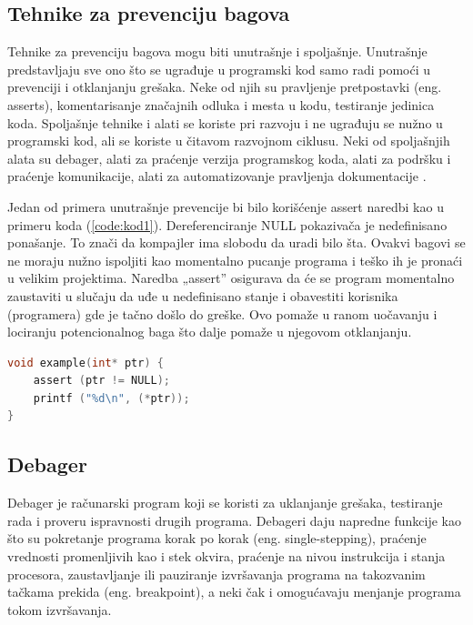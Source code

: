 \documentclass[a4paper]{article}
\begin{document}
\subsection{Tehnike za prevenciju bagova}
\label{subsec:Tehnike za prevenciju bagova}

Tehnike za prevenciju bagova mogu biti unutrašnje i spoljašnje. Unutrašnje predstavljaju sve ono što se ugrađuje u programski kod samo radi pomoći u prevenciji i otklanjanju grešaka. Neke od njih su pravljenje pretpostavki (eng. asserts), komentarisanje značajnih odluka i mesta u kodu, testiranje jedinica koda. Spoljašnje tehnike i alati se koriste pri razvoju i ne ugrađuju se nužno u programski kod, ali se koriste u čitavom razvojnom ciklusu. Neki od spoljašnjih alata su debager, alati za praćenje verzija programskog koda, alati za podršku i praćenje komunikacije, alati za automatizovanje pravljenja dokumentacije \cite{bagovi_smalkov}.  

Jedan od primera unutrašnje prevencije bi bilo korišćenje assert naredbi kao u primeru koda (\ref{code:kod1}). Dereferenciranje NULL pokazivača je nedefinisano ponašanje. To znači da kompajler ima slobodu da uradi bilo šta. Ovakvi bagovi se ne moraju nužno ispoljiti kao momentalno pucanje programa i teško ih je pronaći u velikim projektima. Naredba „assert” osigurava da će se program momentalno zaustaviti u slučaju da uđe u nedefinisano stanje i obavestiti korisnika (programera) gde je tačno došlo do greške. Ovo pomaže u ranom uočavanju i lociranju potencionalnog baga što dalje pomaže u njegovom otklanjanju.\\

\begin{center}
\begin{lstlisting}[language=C,caption=Primer upotrebe assert naredbe, label=code:kod1]
void example(int* ptr) {
    assert (ptr != NULL);
    printf ("%d\n", (*ptr));
}\end{lstlisting}
\end{center}


\subsection{Debager}
\label{subsec:Debager}

Debager je računarski program koji se koristi za uklanjanje grešaka, testiranje rada i proveru ispravnosti drugih programa. Debageri daju napredne funkcije kao što su pokretanje programa korak po korak (eng. single-stepping), praćenje vrednosti promenljivih kao i stek okvira, praćenje na nivou instrukcija i stanja procesora, zaustavljanje ili pauziranje izvršavanja programa na takozvanim tačkama prekida (eng. breakpoint), a neki čak i omogućavaju menjanje programa tokom izvršavanja.
\end{document}
